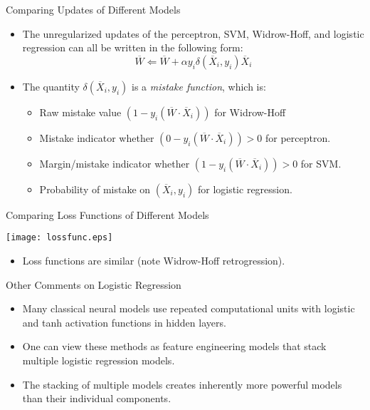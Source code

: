 \begin{frame}{Comparing Updates of Different Models}
\begin{itemize}
\item The unregularized updates of the perceptron, SVM, Widrow-Hoff, and logistic
regression can all be written in the following form:
\begin{equation*}
\overline{W} \Leftarrow \overline{W} +  \alpha y_i
\delta(\overline{X}_i, y_i) \overline{X}_i
\end{equation*}
\item The quantity $\delta(\overline{X}_i, y_i)$ is a {\em mistake
function}, which is:
\begin{itemize}
\item Raw mistake value $(1- y_i (\overline{W}\cdot \overline{X}_i))$ for Widrow-Hoff
\item Mistake indicator whether  $(0- y_i (\overline{W}\cdot
\overline{X}_i))>0$ for perceptron.
\item Margin/mistake indicator whether $(1- y_i (\overline{W}\cdot
\overline{X}_i))>0$ for SVM.
\item Probability of mistake on $(\overline{X}_i, y_i)$ for logistic
regression.
\end{itemize}
\end{itemize}
\end{frame}


\begin{frame}{Comparing Loss Functions of Different Models}
\begin{center}
\texttt{[image: lossfunc.eps]}
\end{center}
\begin{itemize}
\item Loss
functions are  similar (note  Widrow-Hoff retrogression).
\end{itemize}
\end{frame}


\begin{frame}{Other Comments on Logistic Regression} \begin{itemize}
\item Many classical neural models use repeated  computational units with  logistic and tanh
activation functions in hidden layers.
\item One can view these methods as feature engineering models that
stack multiple logistic regression models.
\item The stacking of multiple models creates inherently more
powerful models than their individual components.
\end{itemize}
\end{frame}



